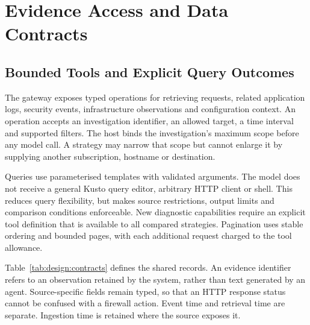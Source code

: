 \section{Evidence Access and Data Contracts}
\label{sec:design:evidence}

\subsection{Bounded Tools and Explicit Query Outcomes}

The gateway exposes typed operations for retrieving requests, related
application logs, security events, infrastructure observations and
configuration context. An operation accepts an investigation identifier,
an allowed target, a time interval and supported filters. The host binds
the investigation's maximum scope before any model call. A strategy may
narrow that scope but cannot enlarge it by supplying another subscription,
hostname or destination.

Queries use parameterised templates with validated arguments. The model
does not receive a general Kusto query editor, arbitrary HTTP client or
shell. This reduces query flexibility, but makes source restrictions,
output limits and comparison conditions enforceable. New diagnostic
capabilities require an explicit tool definition that is available to
all compared strategies. Pagination uses stable ordering and bounded
pages, with each additional request charged to the tool allowance.

Table~\ref{tab:design:contracts} defines the shared records. An evidence
identifier refers to an observation retained by the system, rather than
text generated by an agent. Source-specific fields remain typed, so that
an HTTP response status cannot be confused with a firewall action.
Event time and retrieval time are separate. Ingestion time is retained
where the source exposes it.

